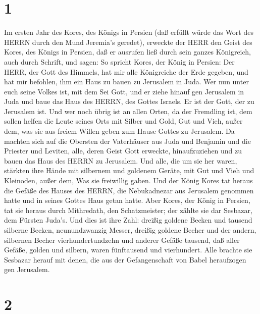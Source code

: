 \hypertarget{section}{%
\section{1}\label{section}}

 Im ersten Jahr des Kores, des Königs in Persien (daß
erfüllt würde das Wort des HERRN durch den Mund Jeremia's geredet),
erweckte der HERR den Geist des Kores, des Königs in Persien, daß er
ausrufen ließ durch sein ganzes Königreich, auch durch Schrift, und
sagen:  So spricht Kores, der König in Persien: Der HERR,
der Gott des Himmels, hat mir alle Königreiche der Erde gegeben, und hat
mir befohlen, ihm ein Haus zu bauen zu Jerusalem in Juda. 
Wer nun unter euch seine Volkes ist, mit dem Sei Gott, und er ziehe
hinauf gen Jerusalem in Juda und baue das Haus des HERRN, des Gottes
Israels. Er ist der Gott, der zu Jerusalem ist.  Und wer
noch übrig ist an allen Orten, da der Fremdling ist, dem sollen helfen
die Leute seines Orts mit Silber und Gold, Gut und Vieh, außer dem, was
sie aus freiem Willen geben zum Hause Gottes zu Jerusalem. 
Da machten sich auf die Obersten der Vaterhäuser aus Juda und Benjamin
und die Priester und Leviten, alle, deren Geist Gott erweckte,
hinaufzuziehen und zu bauen das Haus des HERRN zu Jerusalem.
 Und alle, die um sie her waren, stärkten ihre Hände mit
silbernem und goldenem Geräte, mit Gut und Vieh und Kleinoden, außer
dem, Was sie freiwillig gaben.  Und der König Kores tat
heraus die Gefäße des Hauses des HERRN, die Nebukadnezar aus Jerusalem
genommen hatte und in seines Gottes Haus getan hatte.  Aber
Kores, der König in Persien, tat sie heraus durch Mithredath, den
Schatzmeister; der zählte sie dar Sesbazar, dem Fürsten Juda's.
 Und dies ist ihre Zahl: dreißig goldene Becken und tausend
silberne Becken, neunundzwanzig Messer,  dreißig goldene
Becher und der andern, silbernen Becher vierhundertundzehn und anderer
Gefäße tausend,  daß aller Gefäße, golden und silbern,
waren fünftausend und vierhundert. Alle brachte sie Sesbazar herauf mit
denen, die aus der Gefangenschaft von Babel heraufzogen gen Jerusalem.

\hypertarget{section-1}{%
\section{2}\label{section-1}}

